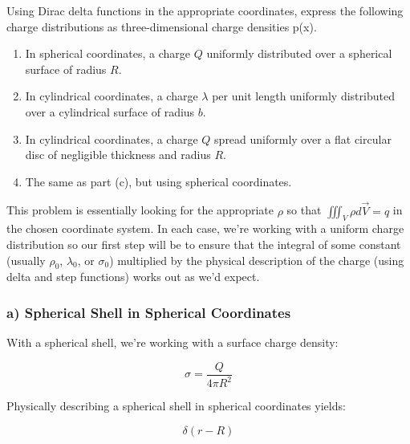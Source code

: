 \begin{question}
  Using Dirac delta functions in the appropriate coordinates, express
  the following charge distributions as three-dimensional charge
  densities p(x).

  \begin{enumerate}[label=\alph*]

    \item In spherical coordinates, a charge $Q$ uniformly distributed
      over a spherical surface of radius $R$.

    \item In cylindrical coordinates, a charge $\lambda$ per unit
      length uniformly distributed over a cylindrical surface of
      radius $b$.

    \item In cylindrical coordinates, a charge $Q$ spread uniformly
      over a flat circular disc of negligible thickness and radius
      $R$.

    \item The same as part (c), but using spherical coordinates.
  \end{enumerate}

\end{question}


This problem is essentially looking for the appropriate $\rho$ so that
$\iiint_V \rho d\vec{V} = q$ in the chosen coordinate system.  In each
case, we're working with a uniform charge distribution so our first
step will be to ensure that the integral of some constant (usually
$\rho_0$, $\lambda_0$, or $\sigma_0$) multiplied by the physical
description of the charge (using delta and step functions) works out
as we'd expect.


\subsubsection*{a) Spherical Shell in Spherical Coordinates}

With a spherical shell, we're working with a surface charge density:

\begin{equation}
  \sigma = \frac{Q}{4\pi{}R^2}
\end{equation}

Physically describing a spherical shell in spherical coordinates yields:

\begin{equation}
  \delta(r-R)
\end{equation}


